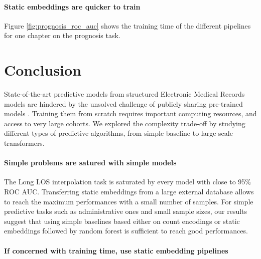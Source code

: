\documentclass[french,12pt,twoside,a4paper]{book}
\begin{document}
\paragraph{Static embeddings are quicker to train}%

Figure \ref{fig:prognosis_roc_auc} shows the training time of the different
pipelines for one chapter on the prognosis task.



\section{Conclusion}\label{sec:predictive_models:conclusion}


State-of-the-art predictive models from structured Electronic Medical Records
models are hindered by the unsolved challenge of publicly sharing pre-trained
models \citep{wornow2023shaky}. Training them from scratch requires important
computing resources, and access to very large cohorts. We explored the
complexity trade-off by studying different types of predictive algorithms, from
simple baseline to large scale transformers.


\paragraph{Simple problems are satured with simple models} The Long LOS
interpolation task is saturated by every model with close to 95\% ROC AUC.
Transferring static embeddings from a large external database allows to reach the
maximum performances with a small number of samples. For simple predictive tasks
such as administrative ones and small sample sizes, our results suggest that
using simple baselines based either on count encodings or static embeddings
followed by random forest is sufficient to reach good performances.

\paragraph{If concerned with training time, use static embedding pipelines}
\end{document}
